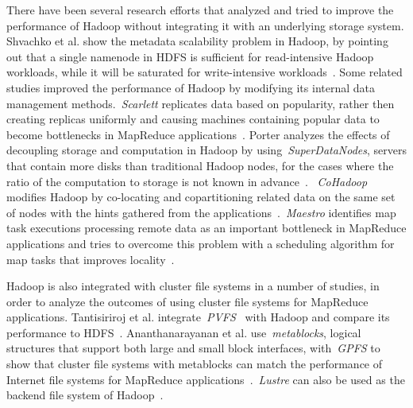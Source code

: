 \documentclass[preprint,12pt]{elsarticle}
\begin{document}
There have been several research efforts that analyzed and tried to improve the performance of Hadoop without
integrating it with an underlying storage system. Shvachko et al. show the metadata scalability problem in Hadoop,
by pointing out that a single namenode in HDFS 
is sufficient for read-intensive Hadoop workloads, while it will be saturated for write-intensive
workloads~\cite{shvachko2010hdfs}. Some related studies improved the performance of Hadoop by modifying
its internal data management methods.~\textit{Scarlett} replicates data based on popularity, rather then
creating replicas uniformly and causing machines containing popular data to become bottlenecks in MapReduce
applications~\cite{Ananthanarayanan:2011:SCS:1966445.1966472}. Porter analyzes the effects of decoupling storage and
computation in Hadoop by using~\textit{SuperDataNodes}, servers that contain more disks than traditional Hadoop nodes,
for the cases where the ratio of the computation to storage is not known in advance~\cite{Porter:2010:DSC:1773912.1773923}.
~\textit{CoHadoop} modifies Hadoop by co-locating and copartitioning related data on the same set of nodes with the hints
gathered from the applications~\cite{Eltabakh:2011:CFD:2002938.2002943}.~\textit{Maestro} identifies map task executions
processing remote data as an important bottleneck in MapReduce applications and tries to overcome this problem with
a scheduling algorithm for map tasks that improves locality~\cite{6217451}.


Hadoop is also integrated with cluster file systems in a number of studies, in order to analyze the outcomes of using
cluster file systems for MapReduce applications. Tantisiriroj et al. integrate~\textit{PVFS}~\cite{Carns:2000:PPF:1268379.1268407}
with Hadoop and compare its performance to
HDFS~\cite{Tantisiriroj:2011:DDF:2063384.2063474}. Ananthanarayanan et al. use~\textit{metablocks}, logical
structures that support both large and small block interfaces, with~\textit{GPFS} to show that cluster file systems with
metablocks can match the performance of Internet file systems for MapReduce
applications~\cite{Ananthanarayanan:2009:CAW:1855533.1855548}.~\textit{Lustre} can also be used as the
backend file system of Hadoop~\cite{lustre_with_hadoop}.
\end{document}
